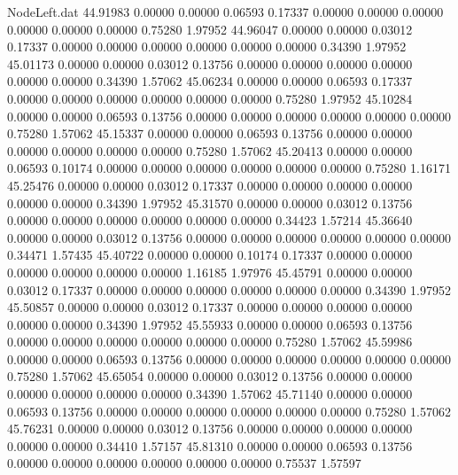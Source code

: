 \begin{filecontents}{NodeLeft.dat}
  44.91983    0.00000    0.00000     0.06593    0.17337    0.00000    0.00000    0.00000    0.00000    0.00000    0.00000    0.75280    1.97952
  44.96047    0.00000    0.00000     0.03012    0.17337    0.00000    0.00000    0.00000    0.00000    0.00000    0.00000    0.34390    1.97952
  45.01173    0.00000    0.00000     0.03012    0.13756    0.00000    0.00000    0.00000    0.00000    0.00000    0.00000    0.34390    1.57062
  45.06234    0.00000    0.00000     0.06593    0.17337    0.00000    0.00000    0.00000    0.00000    0.00000    0.00000    0.75280    1.97952
  45.10284    0.00000    0.00000     0.06593    0.13756    0.00000    0.00000    0.00000    0.00000    0.00000    0.00000    0.75280    1.57062
  45.15337    0.00000    0.00000     0.06593    0.13756    0.00000    0.00000    0.00000    0.00000    0.00000    0.00000    0.75280    1.57062
  45.20413    0.00000    0.00000     0.06593    0.10174    0.00000    0.00000    0.00000    0.00000    0.00000    0.00000    0.75280    1.16171
  45.25476    0.00000    0.00000     0.03012    0.17337    0.00000    0.00000    0.00000    0.00000    0.00000    0.00000    0.34390    1.97952
  45.31570    0.00000    0.00000     0.03012    0.13756    0.00000    0.00000    0.00000    0.00000    0.00000    0.00000    0.34423    1.57214
  45.36640    0.00000    0.00000     0.03012    0.13756    0.00000    0.00000    0.00000    0.00000    0.00000    0.00000    0.34471    1.57435
  45.40722    0.00000    0.00000     0.10174    0.17337    0.00000    0.00000    0.00000    0.00000    0.00000    0.00000    1.16185    1.97976
  45.45791    0.00000    0.00000     0.03012    0.17337    0.00000    0.00000    0.00000    0.00000    0.00000    0.00000    0.34390    1.97952
  45.50857    0.00000    0.00000     0.03012    0.17337    0.00000    0.00000    0.00000    0.00000    0.00000    0.00000    0.34390    1.97952
  45.55933    0.00000    0.00000     0.06593    0.13756    0.00000    0.00000    0.00000    0.00000    0.00000    0.00000    0.75280    1.57062
  45.59986    0.00000    0.00000     0.06593    0.13756    0.00000    0.00000    0.00000    0.00000    0.00000    0.00000    0.75280    1.57062
  45.65054    0.00000    0.00000     0.03012    0.13756    0.00000    0.00000    0.00000    0.00000    0.00000    0.00000    0.34390    1.57062
  45.71140    0.00000    0.00000     0.06593    0.13756    0.00000    0.00000    0.00000    0.00000    0.00000    0.00000    0.75280    1.57062
  45.76231    0.00000    0.00000     0.03012    0.13756    0.00000    0.00000    0.00000    0.00000    0.00000    0.00000    0.34410    1.57157
  45.81310    0.00000    0.00000     0.06593    0.13756    0.00000    0.00000    0.00000    0.00000    0.00000    0.00000    0.75537    1.57597

\end{filecontents}
